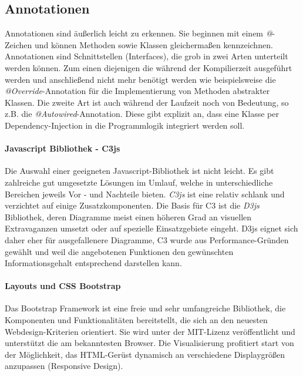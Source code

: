 \subsection{Annotationen}
Annotationen sind äußerlich leicht zu erkennen. Sie beginnen mit einem \emph{@}-Zeichen und können Methoden sowie Klassen gleichermaßen kennzeichnen. Annotationen sind Schnittstellen (Interfaces), die grob in zwei Arten unterteilt werden können. Zum einen diejenigen die während der Kompilierzeit ausgeführt werden und anschließend nicht mehr benötigt werden wie beispielsweise die \emph{@Override}-Annotation für die Implementierung von Methoden abstrakter Klassen. Die zweite Art ist auch während der Laufzeit noch von Bedeutung, so z.B. die \emph{@Autowired}-Annotation. Diese gibt explizit an, dass eine Klasse per Dependency-Injection in die Programmlogik integriert werden soll. 

\paragraph{Javascript Bibliothek - C3js}
Die Auswahl einer geeigneten Javascript-Bibliothek ist nicht leicht. Es gibt zahlreiche gut umgesetzte Lösungen im Umlauf, welche in unterschiedliche Bereichen jeweils Vor - und Nachteile bieten. \emph{C3js} ist eine relativ schlank und verzichtet auf einige Zusatzkomponenten. Die Basis für C3 ist die \emph{D3js} Bibliothek, deren Diagramme meist einen höheren Grad an visuellen Extravaganzen umsetzt oder auf spezielle Einsatzgebiete eingeht. D3js eignet sich daher eher für ausgefallenere Diagramme, C3 wurde aus Performance-Gründen gewählt und weil die angebotenen Funktionen den gewünschten Informationsgehalt entsprechend darstellen kann.   

\paragraph{Layouts und CSS Bootstrap}
Das Bootstrap Framework ist eine freie und sehr umfangreiche Bibliothek, die Komponenten und Funktionalitäten bereitstellt, die sich an den neuesten Webdesign-Kriterien orientiert. Sie wird unter der MIT-Lizenz veröffentlicht und unterstützt die am bekanntesten Browser. Die Visualisierung profitiert start von der Möglichkeit, das HTML-Gerüst dynamisch an verschiedene Displaygrößen anzupassen (Responsive Design). 

